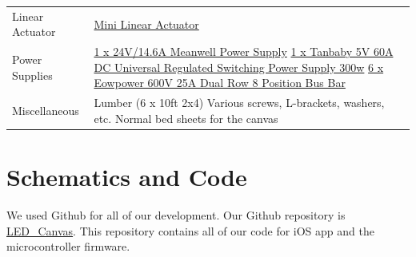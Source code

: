\documentclass[12pt]{article}
\begin{document}
\begin{appendices}
\begin{longtable}{ p{5cm} p{10cm} }
    Linear Actuator              & \href{https://openbuildspartstore.com/micro-limit-switch-kit/}{
Mini Linear Actuator} \\[0.4cm]
    
    Power Supplies               & \href{https://openbuildspartstore.com/24v-14-6a-meanwell-power-supply/}{1 x 24V/14.6A Meanwell Power Supply} \newline
    \href{https://www.amazon.com/Tanbaby-Universal-Regulated-Switching-Computer/dp/B017YEOAPA}{1 x Tanbaby 5V 60A DC Universal Regulated Switching Power Supply 300w} \newline
    \href{https://www.amazon.com/gp/product/B06XKFCTSM/ref=oh_aui_detailpage_o05_s00?ie=UTF8&psc=1}{6 x Eowpower 600V 25A Dual Row 8 Position Bus Bar } \\
    
    Miscellaneous                & Lumber (6 x 10ft 2x4) \newline
    Various screws, L-brackets, washers, etc. \newline
    Normal bed sheets for the canvas\\
  \end{longtable}
  
  \section{Schematics and Code}
  We used Github for all of our development. Our Github repository is \href{https://github.com/rajp20/LED_Canvas}{LED\_Canvas}. This repository contains all of our code for iOS app and the microcontroller firmware. 
\end{appendices}
\end{document}
